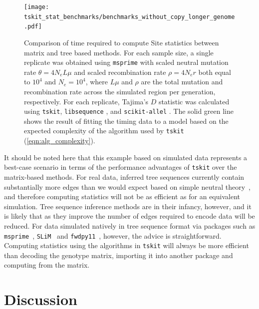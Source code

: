 \documentclass[9pt,twoside,lineno]{gsajnl}
\newcommand{\tskit}{{\texttt{tskit}}}
\begin{document}
\begin{figure}
    \centering
    \texttt{[image: tskit\_stat\_benchmarks/benchmarks\_without\_copy\_longer\_genome.pdf]}
    \caption{Comparison of time required to compute Site statistics
        between matrix and tree based methods. For each sample size, a single replicate
        was obtained using \texttt{msprime} with scaled neutral mutation rate $\theta = 4 N_e L \mu$ and
        scaled recombination rate $\rho = 4N_er$ both equal to $10^4$ and $N_e = 10^4$,
        where $L\mu$ and $\rho$ are the total mutation and recombination rate across the simulated region
        per generation, respectively.
        For each replicate, Tajima's $D$
        \citep{Tajima1989-de} statistic was calculated using \tskit, \texttt{libsequence}
        \citep{Thornton2003-wj}, and \texttt{scikit-allel} \citep{miles2017scikit}.
        The solid green line shows the result of fitting the timing data to a model based on the expected complexity of the algorithm used by \texttt{tskit}
        (\autoref{eqn:alg_complexity}).
        \label{fig:stats_performance}
    }
\end{figure}

It should be noted here that this example based on simulated data
represents a best-case scenario in terms of the performance advantages
of \tskit{} over the matrix-based methods. For real data, inferred
tree sequences currently contain substantially more edges than we
would expect based on simple neutral theory~\citep{kelleher2019inferring},
and therefore computing statistics will not be as efficient as
for an equivalent simulation. Tree sequence inference
methods are in their infancy, however, and it is likely that
as they improve the number of edges required to encode data will
be reduced. For data simulated natively in tree sequence format
via packages such as \texttt{msprime}~\citep{kelleher2016efficient},
\texttt{SLiM}~\citep{haller2018tree,haller2019slim} and
\texttt{fwdpy11}~\citep{thornton2014c++}, however, the advice is straightforward.
Computing statistics using the algorithms in \tskit{}
will always be more efficient than decoding the genotype
matrix, importing it into another package and computing from the matrix.



\section*{Discussion}
\end{document}
